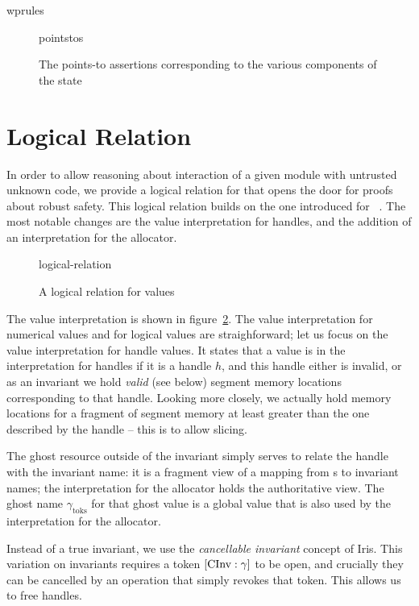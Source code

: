 \documentclass[acmsmall,screen]{acmart}\settopmatter{}
\begin{document}
{wprules}
\begin{figure}
{pointstos}
\caption{The points-to assertions corresponding to the various components of the state}
\label{fig:pointstos}
\end{figure}

\section{Logical Relation}

In order to allow reasoning about interaction of a given module with untrusted unknown code, we provide a logical relation for \irismswasm that opens the door for proofs about robust safety. This logical relation builds on the one introduced for \iriswasm~\cite{iriswasm}. The most notable changes are the value interpretation for handles, and the addition of an interpretation for the allocator.

\begin{figure}[t]
{logical-relation}
\label{app:fig:lrv}
\caption{A logical relation for values}
\end{figure}

The value interpretation is shown in figure~\ref{app:fig:lrv}. The value interpretation for numerical values and for logical values are straighforward; let us focus on the value interpretation for handle values. It states that a value is in the interpretation for handles if it is a handle \( h \), and this handle either is invalid, or as an invariant we hold \emph{valid} (see below) segment memory locations corresponding to that handle. Looking more closely, we actually hold memory locations for a fragment of segment memory at least greater than the one described by the handle -- this is to allow slicing.

The ghost resource outside of the invariant simply serves to relate the handle \xxWid with the invariant name: it is a fragment view of a mapping from \xxWid{}s to invariant names; the interpretation for the allocator holds the authoritative view. The ghost name \( \gamma_{\mathrm{toks}} \) for that ghost value is a global value that is also used by the interpretation for the allocator.

Instead of a true invariant, we use the \emph{cancellable invariant} concept of Iris. This variation on invariants requires a token \( {[}\textrm{CInv}:\gamma{]} \) to be open, and crucially they can be cancelled by an operation that simply revokes that token. This allows us to free handles. 
\end{document}
